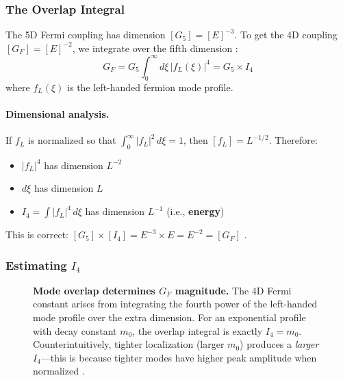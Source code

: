 \subsubsection{The Overlap Integral}

The 5D Fermi coupling has dimension $[G_5] = [E]^{-3}$. To get the 4D coupling
$[G_F] = [E]^{-2}$, we integrate over the fifth dimension \tagDc{}:
\begin{equation}
    G_F = G_5 \int_0^\infty d\xi \, |f_L(\xi)|^4 = G_5 \times I_4
    \label{eq:ch11_overlap}
\end{equation}
where $f_L(\xi)$ is the left-handed fermion mode profile.

\paragraph{Dimensional analysis.}
If $f_L$ is normalized so that $\int_0^\infty |f_L|^2 \, d\xi = 1$, then
$[f_L] = L^{-1/2}$. Therefore:
\begin{itemize}[nosep]
    \item $|f_L|^4$ has dimension $L^{-2}$
    \item $d\xi$ has dimension $L$
    \item $I_4 = \int |f_L|^4 \, d\xi$ has dimension $L^{-1}$ (i.e., \textbf{energy})
\end{itemize}
This is correct: $[G_5] \times [I_4] = E^{-3} \times E = E^{-2} = [G_F]$ \tagM{}.

\subsubsection{Estimating $I_4$}

\begin{figure}[htbp]
\centering

\caption{\textbf{Mode overlap determines $G_F$ magnitude.}
The 4D Fermi constant arises from integrating the fourth power of the
left-handed mode profile over the extra dimension. For an exponential
profile with decay constant $m_0$, the overlap integral is exactly
$I_4 = m_0$. Counterintuitively, tighter localization (larger $m_0$)
produces a \emph{larger} $I_4$---this is because tighter modes have
higher peak amplitude when normalized \tagM{}.}
\label{fig:ch11_mode_overlap}
\end{figure}


